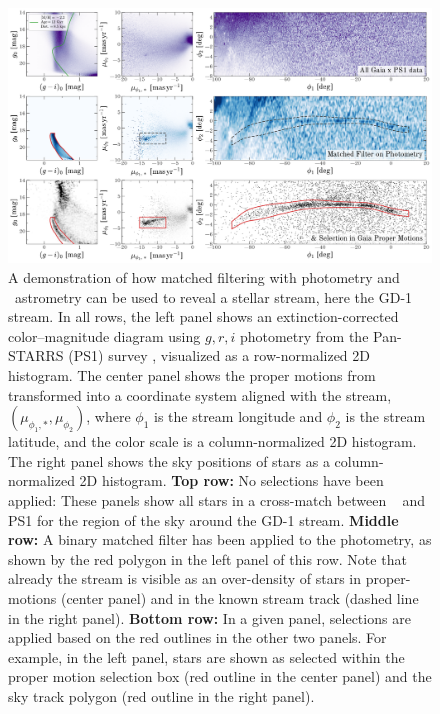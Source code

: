 \documentclass[final,5p,times,twocolumn,authoryear]{elsarticle}
\begin{document}
\begin{figure}[t!]
    \begin{center}
    \includegraphics[width=1\textwidth]{gd1-filter-demo.pdf}
    \end{center}
    \caption{%
    A demonstration of how matched filtering with photometry and \gaia\ astrometry can
    be used to reveal a stellar stream, here the GD-1 stream.
    In all rows, the left panel shows an extinction-corrected color--magnitude diagram
    using $g, r, i$ photometry from the Pan-STARRS (PS1) survey \citep{chambers:2016},
    visualized as a row-normalized 2D histogram.
    The center panel shows the proper motions from \gaia\  \citep{gaiadr3}
    transformed into a coordinate system aligned with the stream, $(\mu_{\phi_1, *},
    \mu_{\phi_2})$, where $\phi_1$ is the stream longitude and $\phi_2$ is the stream
    latitude, and the color scale is a column-normalized 2D histogram.
    The right panel shows the sky positions of stars as a column-normalized 2D
    histogram.
    \textbf{Top row:} No selections have been applied: These panels show all stars in a
    cross-match between \gaia\  and PS1 for the region of the sky around the GD-1
    stream.
    \textbf{Middle row:} A binary matched filter has been applied to the photometry, as
    shown by the red polygon in the left panel of this row.
    Note that already the stream is visible as an over-density of stars in
    proper-motions (center panel) and in the known stream track (dashed line in the
    right panel).
    \textbf{Bottom row:} In a given panel, selections are applied based on the red
    outlines in the other two panels.
    For example, in the left panel, stars are shown as selected within the proper motion
    selection box (red outline in the center panel) and the sky track polygon (red
    outline in the right panel).
    }
    \label{fig:gd1-demo}
\end{figure}
\end{document}
